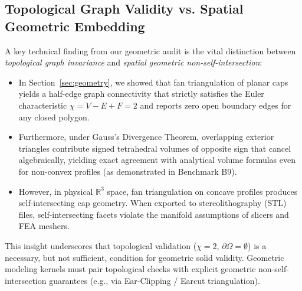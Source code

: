\subsection{Topological Graph Validity vs. Spatial Geometric Embedding}
A key technical finding from our geometric audit is the vital distinction between \textit{topological graph invariance} and \textit{spatial geometric non-self-intersection}:
\begin{itemize}
    \item In Section~\ref{sec:geometry}, we showed that fan triangulation of planar caps yields a half-edge graph connectivity that strictly satisfies the Euler characteristic $\chi = V - E + F = 2$ and reports zero open boundary edges for any closed polygon.
    \item Furthermore, under Gauss's Divergence Theorem, overlapping exterior triangles contribute signed tetrahedral volumes of opposite sign that cancel algebraically, yielding exact agreement with analytical volume formulas even for non-convex profiles (as demonstrated in Benchmark B9).
    \item However, in physical $\mathbb{R}^3$ space, fan triangulation on concave profiles produces self-intersecting cap geometry. When exported to stereolithography (STL) files, self-intersecting facets violate the manifold assumptions of slicers and FEA meshers.
\end{itemize}
This insight underscores that topological validation ($\chi = 2$, $\partial \Omega = \emptyset$) is a necessary, but not sufficient, condition for geometric solid validity. Geometric modeling kernels must pair topological checks with explicit geometric non-self-intersection guarantees (e.g., via Ear-Clipping / Earcut triangulation).

